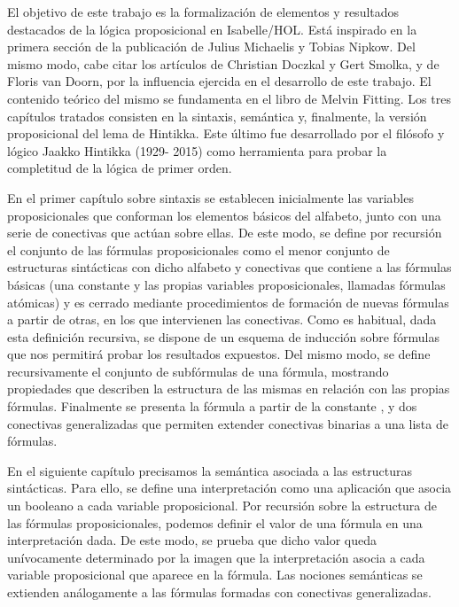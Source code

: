 \begin{isabellebody}
\begin{isamarkuptext}
  El objetivo de este trabajo es la formalización de elementos y 
  resultados destacados de la lógica proposicional en Isabelle/HOL. 
  Está inspirado en la primera sección de la publicación   de Julius Michaelis y Tobias Nipkow. Del mismo 
  modo, cabe citar los artículos   de Christian Doczkal y Gert Smolka, y 
    de Floris van Doorn, por la 
  influencia ejercida en el desarrollo de este trabajo. El contenido 
  teórico del mismo se fundamenta en el libro   de Melvin Fitting. Los tres capítulos 
  tratados consisten en la sintaxis, semántica y, finalmente, la versión 
  proposicional del lema de Hintikka. Este último fue desarrollado por 
  el filósofo y lógico Jaakko Hintikka (1929- 2015) como herramienta 
  para probar la completitud de la lógica de primer orden.

  En el primer capítulo sobre sintaxis se establecen inicialmente las
  variables proposicionales que conforman los elementos básicos del 
  alfabeto, junto con una serie de conectivas que actúan sobre ellas. 
  De este modo, se define por recursión el conjunto de las fórmulas 
  proposicionales como el menor conjunto de estructuras sintácticas 
  con dicho alfabeto y conectivas que contiene a las fórmulas
  básicas (una constante \isa{{\isasymbottom}} y las propias variables proposicionales, 
  llamadas fórmulas atómicas) y es cerrado mediante procedimientos de 
  formación de nuevas fórmulas a partir de otras, en los que intervienen 
  las conectivas. Como es habitual, dada esta definición 
  recursiva, se dispone de un esquema de inducción sobre fórmulas que
  nos permitirá probar los resultados expuestos. Del mismo modo, se 
  define recursivamente el conjunto de subfórmulas de una fórmula, 
  mostrando propiedades que describen la estructura de las mismas en 
  relación con las propias fórmulas. Finalmente se presenta la 
  fórmula \isa{{\isasymtop}} a partir de la constante \isa{{\isasymbottom}}, y dos conectivas 
  generalizadas que permiten extender conectivas binarias a una lista de 
  fórmulas.  

  En el siguiente capítulo precisamos la semántica asociada a las 
  estructuras sintácticas. Para ello, se define una interpretación como 
  una aplicación que asocia un booleano a cada variable proposicional. 
  Por recursión sobre la estructura de las fórmulas proposicionales, 
  podemos definir el valor de una fórmula en una interpretación dada. 
  De este modo, se prueba que dicho valor queda unívocamente determinado 
  por la imagen que la interpretación asocia a cada variable
  proposicional que aparece en la fórmula. Las nociones semánticas se 
  extienden análogamente a las fórmulas formadas con conectivas 
  generalizadas.


\end{isamarkuptext}
\end{isabellebody}
